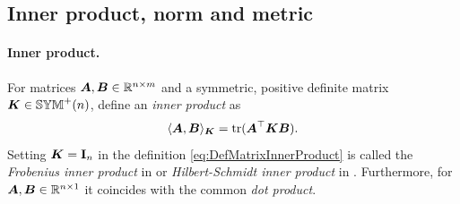\subsection{Inner product, norm and metric}\label{sec:MathLinalgInnerNormMetric}
\paragraph{Inner product.}
For matrices $\mat{A}, \mat{B} \in \RealNum^{n\times m}$ and a symmetric, positive definite matrix $ \mat{K} \in \SymMatP(n)$, define an \textit{inner product} as
\begin{align}\label{eq:DefMatrixInnerProduct}
 \sProd[\mat{K}]{\mat{A}}{\mat{B}} = \tr(\mat{A}^\top \mat{K} \mat{B}).
\end{align}
Setting $\mat{K} = \idMat[n]$ in the definition \eqref{eq:DefMatrixInnerProduct} is called the \textit{Frobenius inner product} in \cite[sec.\ 5.2]{Horn:MatrixAnalysis} or \textit{Hilbert-Schmidt inner product} in \cite[sec.\ A.6]{Hall:LieGroups}.
Furthermore, for $\mat{A}, \mat{B} \in \RealNum^{n\times 1}$ it coincides with the common \textit{dot product}.

